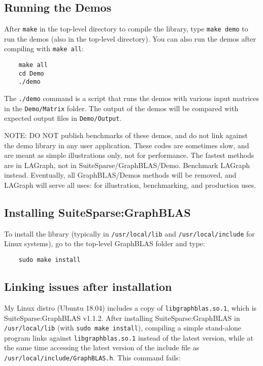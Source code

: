 \documentclass[12pt]{article}
\begin{document}
\subsection{Running the Demos}

After \verb'make' in the top-level directory to compile the library, type
\verb'make demo' to run the demos (also in the top-level directory).
You can also run the demos after compiling with \verb'make all':

    {\small
    \begin{verbatim}
    make all
    cd Demo
    ./demo \end{verbatim} }

The \verb'./demo' command is a script that runs the demos with various input
matrices in the \verb'Demo/Matrix' folder.  The output of the demos will be
compared with expected output files in \verb'Demo/Output'.

NOTE:
DO NOT publish benchmarks of these demos, and do not link against the
demo library in any user application.  These codes are sometimes slow,
and are meant as simple illustrations only, not for performance.  The fastest
methods are in LAGraph, not in SuiteSparse/GraphBLAS/Demo.  Benchmark LAGraph
instead.  Eventually, all GraphBLAS/Demos methods will be removed, and LAGraph
will serve all uses: for illustration, benchmarking, and production uses.

\subsection{Installing SuiteSparse:GraphBLAS}

To install the library (typically in \verb'/usr/local/lib' and
\verb'/usr/local/include' for Linux systems), go to the top-level GraphBLAS
folder and type:

    {\small
    \begin{verbatim}
    sudo make install \end{verbatim} }

\subsection{Linking issues after installation}

My Linux distro (Ubuntu 18.04) includes a copy of \verb'libgraphblas.so.1',
which is SuiteSparse:GraphBLAS v1.1.2.  After installing SuiteSparse:GraphBLAS
in \verb'/usr/local/lib' (with \verb'sudo make install'), compiling a simple
stand-alone program links against \verb'libgraphblas.so.1' instead of the
latest version, while at the same time accessing the latest version of the
include file as \verb'/usr/local/include/GraphBLAS.h'.  This command fails:
\end{document}

